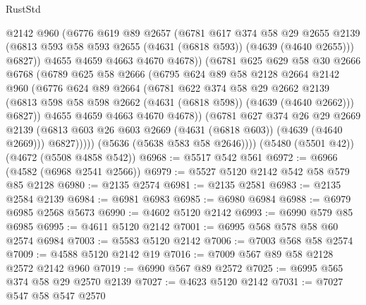 \begin{lexlean}{RustStd}
\begin{coremodule}
{\begin{coremodule}
{{{{{{{{{{{{{{{{                  @2142
                  @960
                  (@6776
                    @619
                    @89
                    @2657
                    (@6781
                      @617
                      @374
                      @58
                      @29
                      @2655
                      @2139
                      (@6813 @593 @58 @593 @2655 (@4631 (@6818 @593)) (@4639 (@4640 @2655)))
                      @6827))
                  @4655
                  @4659
                  @4663
                  @4670
                  @4678))
              (@6781
                @625
                @629
                @58
                @30
                @2666
                @6768
                (@6789
                  @625
                  @58
                  @2666
                  (@6795
                    @624
                    @89
                    @58
                    @2128
                    @2664
                    @2142
                    @960
                    (@6776
                      @624
                      @89
                      @2664
                      (@6781
                        @622
                        @374
                        @58
                        @29
                        @2662
                        @2139
                        (@6813 @598 @58 @598 @2662 (@4631 (@6818 @598)) (@4639 (@4640 @2662)))
                        @6827))
                    @4655
                    @4659
                    @4663
                    @4670
                    @4678))
                (@6781
                  @627
                  @374
                  @26
                  @29
                  @2669
                  @2139
                  (@6813 @603 @26 @603 @2669 (@4631 (@6818 @603)) (@4639 (@4640 @2669)))
                  @6827)))))
        (@5636 (@5638 @583 @58 @2646))))
    (@5480 (@5501 @42))
    (@4672 (@5508 @4858 @542))
@6968 := @5517 @542 @561
@6972 := @6966 (@4582 (@6968 @2541 @2566))
@6979 := @5527 @5120 @2142 @542 @58 @579 @85 @2128
@6980 := @2135 @2574
@6981 := @2135 @2581
@6983 := @2135 @2584 @2139
@6984 := @6981 @6983
@6985 := @6980 @6984
@6988 := @6979 @6985 @2568 @5673
@6990 := @4602 @5120 @2142
@6993 := @6990 @579 @85 @6985
@6995 := @4611 @5120 @2142
@7001 := @6995 @568 @578 @58 @60 @2574 @6984
@7003 := @5583 @5120 @2142
@7006 := @7003 @568 @58 @2574
@7009 := @4588 @5120 @2142 @19
@7016 := @7009 @567 @89 @58 @2128 @2572 @2142 @960
@7019 := @6990 @567 @89 @2572
@7025 := @6995 @565 @374 @58 @29 @2570 @2139
@7027 := @4623 @5120 @2142
@7031 := @7027 @547 @58 @547 @2570
}}}}}}}}}}}}}}}}
\end{coremodule}}
\end{coremodule}
\end{lexlean}
